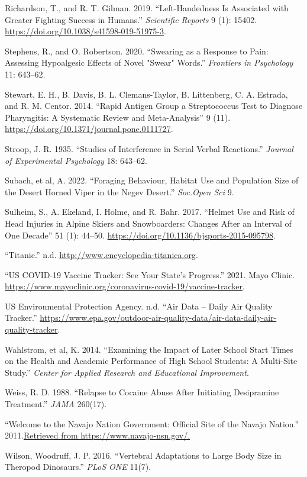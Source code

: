 \documentclass[
]{report}
\newlength{\cslhangindent}
\newenvironment{CSLReferences}[2] %
 {\begin{list}{}{%
  \setlength{\itemindent}{0pt}
  \setlength{\leftmargin}{0pt}
  \setlength{\parsep}{0pt}
  \ifodd #1
   \setlength{\leftmargin}{\cslhangindent}
   \setlength{\itemindent}{-1\cslhangindent}
  \fi
  \setlength{\itemsep}{#2\baselineskip}}}
 {\end{list}}
\begin{document}
\begin{CSLReferences}{1}{0}
Richardson, T., and R. T. Gilman. 2019. {``Left-Handedness Is Associated with Greater Fighting Success in Humans.''} \emph{Scientific Reports} 9 (1): 15402. \url{https://doi.org/10.1038/s41598-019-51975-3}.

Stephens, R., and O. Robertson. 2020. {``Swearing as a Response to Pain: Assessing Hypoalgesic Effects of Novel "Swear" Words.''} \emph{Frontiers in Psychology} 11: 643--62.

Stewart, E. H., B. Davis, B. L. Clemans-Taylor, B. Littenberg, C. A. Estrada, and R. M. Centor. 2014. {``Rapid Antigen Group a Streptococcus Test to Diagnose Pharyngitis: A Systematic Review and Meta-Analysis''} 9 (11). \url{https://doi.org/10.1371/journal.pone.0111727}.

Stroop, J. R. 1935. {``Studies of Interference in Serial Verbal Reactions.''} \emph{Journal of Experimental Psychology} 18: 643--62.

Subach, et al, A. 2022. {``Foraging Behaviour, Habitat Use and Population Size of the Desert Horned Viper in the Negev Desert.''} \emph{Soc.Open Sci} 9.

Sulheim, S., A. Ekeland, I. Holme, and R. Bahr. 2017. {``Helmet Use and Risk of Head Injuries in Alpine Skiers and Snowboarders: Changes After an Interval of One Decade''} 51 (1): 44--50. \url{https://doi.org/10.1136/bjsports-2015-095798}.

{``Titanic.''} n.d. \url{http://www.encyclopedia-titanica.org}.

{``US COVID-19 Vaccine Tracker: See Your State's Progress.''} 2021. Mayo Clinic. \url{https://www.mayoclinic.org/coronavirus-covid-19/vaccine-tracker}.

US Environmental Protection Agency. n.d. {``Air Data -- Daily Air Quality Tracker.''} \url{https://www.epa.gov/outdoor-air-quality-data/air-data-daily-air-quality-tracker}.

Wahlstrom, et al, K. 2014. {``Examining the Impact of Later School Start Times on the Health and Academic Performance of High School Students: A Multi-Site Study.''} \emph{Center for Applied Research and Educational Improvement}.

Weiss, R. D. 1988. {``Relapse to Cocaine Abuse After Initiating Desipramine Treatment.''} \emph{JAMA} 260(17).

{``Welcome to the Navajo Nation Government: Official Site of the Navajo Nation.''} 2011.\href{\%20Retrieved\%20from\%20https://www.navajo-nsn.gov/.}{Retrieved from https://www.navajo-nsn.gov/.}

Wilson, Woodruff, J. P. 2016. {``Vertebral Adaptations to Large Body Size in Theropod Dinosaurs.''} \emph{PLoS ONE} 11(7).

\end{CSLReferences}
\end{document}
